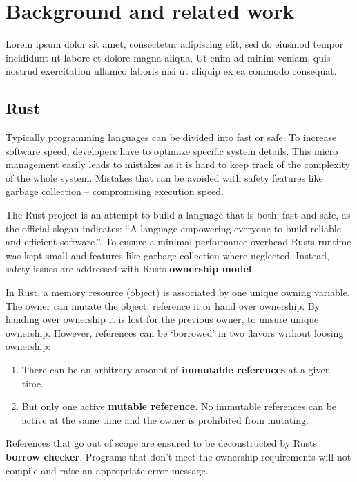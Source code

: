 \chapter{Background and related work}
Lorem ipsum dolor sit amet, consectetur adipiscing elit, sed do eiusmod tempor incididunt ut labore et dolore magna aliqua. Ut enim ad minim veniam, quis nostrud exercitation ullamco laboris nisi ut aliquip ex ea commodo consequat.\cite{klabnik2018rust}
\section{Rust}
\label{rel_rust}
Typically programming languages can be divided into fast or safe: 
To increase software speed, developers have to optimize specific system details.
This micro management easily leads to mistakes as it is hard to keep track of the complexity of the whole system.
Mistakes that can be avoided with safety features like garbage collection -- compromising execution speed.

The Rust project is an attempt to build a language that is both: fast and safe, 
as the official slogan indicates: ``A language empowering everyone
to build reliable and efficient software.''\cite{rustSite}.
To ensure a minimal performance overhead Rusts runtime was kept small\cite[Chapter 16.1]{klabnik2018rust} and features like garbage collection where neglected\cite[Chapter 4]{klabnik2018rust}.
Instead, safety issues are addressed with Rusts \textbf{ownership model}\cite{Matsakis:2014:RL:2692956.2663188}.

In Rust, a memory resource (object) is associated by one unique owning variable.
The owner can mutate the object, reference it or hand over ownership.
By handing over ownership it is lost for the previous owner, to unsure unique ownership.
However, references can be `borrowed' in two flavors without loosing ownership:
\begin{enumerate}
  \item There can be an arbitrary amount of \textbf{immutable references} at a given time.
  \item But only one active \textbf{mutable reference}. 
  No immutable references can be active at the same time and the owner is prohibited from mutating.
\end{enumerate}
References that go out of scope are ensured to be deconstructed by Rusts \textbf{borrow checker}. Programs that don't meet the ownership requirements will not compile and raise an appropriate error message.

